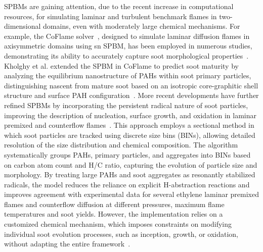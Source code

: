 SPBMs are gaining attention, due to the recent increase in computational resources, for simulating laminar and turbulent benchmark flames in two-dimensional domains, even with moderately large chemical mechanisms. For example, the CoFlame solver~\citep{eaves2016coflame}, designed to simulate laminar diffusion flames in axisymmetric domains using sn SPBM, has been employed in numerous studies, demonstrating its ability to accurately capture soot morphological properties~\citep{dworkin2011application, liu2015numerical}. Kholghy et al. extended the SPBM in CoFlame to predict soot maturity by analyzing the equilibrium nanostructure of PAHs within soot primary particles, distinguishing nascent from mature soot based on an isotropic core-graphitic shell structure and surface PAH configuration~\citep{kholghy2016core}. More recent developments have further refined SPBMs by incorporating the persistent radical nature of soot particles, improving the description of nucleation, surface growth, and oxidation in laminar premixed and counterflow flames~\citep{nobili2022modeling}. This approach employs a sectional method in which soot particles are tracked using discrete size bins (BINs), allowing detailed resolution of the size distribution and chemical composition. The algorithm systematically groups PAHs, primary particles, and aggregates into BINs based on carbon atom count and H/C ratio, capturing the evolution of particle size and morphology. By treating large PAHs and soot aggregates as resonantly stabilized radicals, the model reduces the reliance on explicit H-abstraction reactions and improves agreement with experimental data for several ethylene laminar premixed flames and counterflow diffusion at different pressures, maximum flame temperatures and soot yields. However, the implementation relies on a customized chemical mechanism, which imposes constraints on modifying individual soot evolution processes, such as inception, growth, or oxidation, without adapting the entire framework~\citep{cuoci2015opensmoke++, cuoci2013computational}.


